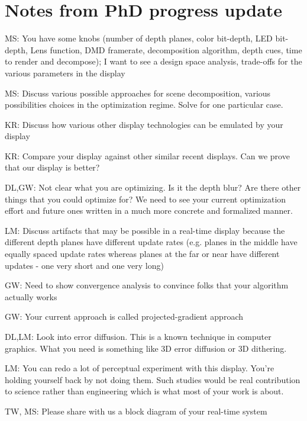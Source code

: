 \section{Notes from PhD progress update}
\begin{compact_itemize}
\item MS: You have some knobs (number of depth planes, color bit-depth, LED bit-depth, Lens function, DMD framerate, decomposition algorithm, depth cues, time to render and decompose); I want to see a design space analysis, trade-offs for the various parameters in the display
\item MS: Discuss various possible approaches for scene decomposition, various possibilities choices in the optimization regime. Solve for one particular case.
\item KR: Discuss how various other display technologies can be emulated by your display
\item KR: Compare your display against other similar recent displays. Can we prove that our display is better?
\item DL,GW: Not clear what you are optimizing. Is it the depth blur? Are there other things that you could optimize for? We need to see your current optimization effort and future ones written in a much more concrete and formalized manner. 
\item LM: Discuss artifacts that may be possible in a real-time display because the different depth planes have different update rates (e.g. planes in the middle have equally spaced update rates whereas planes at the far or near have different updates - one very short and one very long)
\item GW: Need to show convergence analysis to convince folks that your algorithm actually works
\item GW: Your current approach is called projected-gradient approach
\item DL,LM: Look into error diffusion. This is a known technique in computer graphics. What you need is something like 3D error diffusion or 3D dithering.
\item LM: You can redo a lot of perceptual experiment with this display. You're holding yourself back by not doing them. Such studies would be real contribution to science rather than engineering which is what most of your work is about.
\item TW, MS: Please share with us a block diagram of your real-time system
\end{compact_itemize}

